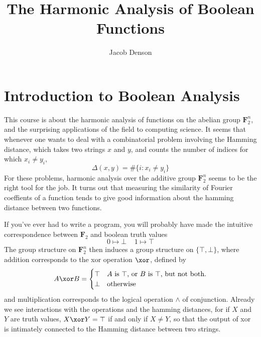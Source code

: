 

\title{The Harmonic Analysis of Boolean Functions}
\author{Jacob Denson}




\maketitle

\tableofcontents


\chapter{Introduction to Boolean Analysis}

This course is about the harmonic analysis of functions on the abelian group $\mathbf{F}_2^n$, and the surprising applications of the field to computing science. It seems that whenever one wants to deal with a combinatorial problem involving the Hamming distance, which takes two strings $x$ and $y$, and counts the number of indices for which $x_i \neq y_i$,
%
\[ \Delta(x,y) = \# \{ i : x_i \neq y_i \} \]
%
For these problems, harmonic analysis over the additive group $\mathbf{F}_2^n$ seems to be the right tool for the job. It turns out that measuring the similarity of Fourier coeffients of a function tends to give good information about the hamming distance between two functions.

If you've ever had to write a program, you will probably have made the intuitive correspondence between $\mathbf{F}_2$ and boolean truth values
%
\[ 0 \mapsto \bot\ \ \ \ \ 1 \mapsto \top \]
%
The group structure on $\mathbf{F}_2^n$ then induces a group structure on $\{ \top, \bot \}$, where addition corresponds to the xor operation $\xor$, defined by
%
\[ A \xor B = \begin{cases} \top & A\ \text{is}\ \top\text{, or}\ B\ \text{is}\ \top\text{, but not both.}\\ \bot & \text{otherwise} \end{cases} \]
%
and multiplication corresponds to the logical operation $\wedge$ of conjunction. Already we see interactions with the operations and the hamming distances, for if $X$ and $Y$ are truth values, $X \xor Y = \top$ if and only if $X \neq Y$, so that the output of xor is intimately connected to the Hamming distance between two strings.

